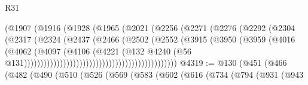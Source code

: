 \begin{lexlean}{R31}
\begin{coremodule}
                                              (@1907
                                                (@1916
                                                  (@1928
                                                    (@1965
                                                      (@2021
                                                        (@2256
                                                          (@2271
                                                            (@2276
                                                              (@2292
                                                                (@2304
                                                                  (@2317
                                                                    (@2324
                                                                      (@2437
                                                                        (@2466
                                                                          (@2502
                                                                            (@2552
                                                                              (@3915
                                                                                (@3950
                                                                                  (@3959
                                                                                    (@4016
                                                                                      (@4062
                                                                                        (@4097
                                                                                          (@4106
                                                                                            (@4221
                                                                                              (@132
                                                                                                @4240
                                                                                                (@56
                                                                                                  @131)))))))))))))))))))))))))))))))))))))))))))))))
@4319 := @130
    (@451
      (@466
        (@482
          (@490
            (@510
              (@526
                (@569
                  (@583
                    (@602
                      (@616
                        (@734
                          (@794
                            (@931
                              (@943

\end{coremodule}
\end{lexlean}
